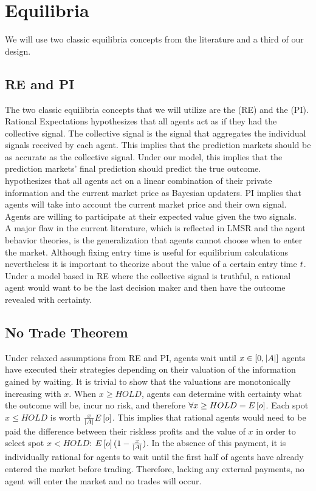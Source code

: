 \section{Equilibria}
We will use two classic equilibria concepts from the literature and a third of our design. 

\subsection{RE and PI}
The two classic equilibria concepts that we will utilize are the  (RE) and the  (PI). Rational Expectations hypothesizes that all agents act as if they had the collective signal. The collective signal is the signal that aggregates the individual signals received by each agent. This implies that the prediction markets should be as accurate as the collective signal. Under our model, this implies that the prediction markets' final prediction should predict the true outcome. \\

 hypothesizes that all agents act on a linear combination of their private information and the current market price as Bayesian updaters. PI implies that agents will take into account the current market price and their own signal. Agents are willing to participate at their expected value given the two signals. \\

A major flaw in the current literature, which is reflected in LMSR and the agent behavior theories, is the generalization that agents cannot choose when to enter the market. Although fixing entry time is useful for equilibrium calculations nevertheless it is important to theorize about the value of a certain entry time $t$. Under a model based in RE where the collective signal is truthful, a rational agent would want to be the last decision maker and then have the outcome revealed with certainty.\\

\subsection{No Trade Theorem}
Under relaxed assumptions from RE and PI, agents wait until $x \in \left[0, |A| \right]$ agents have executed
their strategies depending on their valuation of the information gained by waiting. It is trivial to show that 
the valuations are monotonically increasing with $x$. When $x \geq HOLD$, agents can 
determine with certainty what the outcome will be, incur no risk, and therefore $\forall x \geq HOLD = E\left[o\right]$.
Each spot  $x \leq HOLD$ is worth $\frac{x}{|A|} 
E\left[o\right]$. This implies that rational agents
would need to be paid the difference between their riskless profits and the value of $x$ in order to select spot $x < HOLD$: $E\left[o\right](1 - \frac{x}{|A|})$. In the absence of this payment, it is individually rational for agents to wait until the first half of agents have already entered the market before trading. Therefore, lacking any external payments, no agent will enter the market and no
trades will occur.

